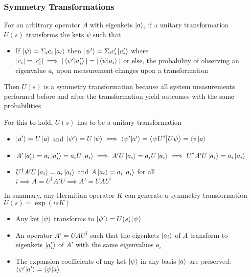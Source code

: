 \documentclass[8pt,t,mathserif,aspectratio=169]{beamer}
\begin{document}
\begin{frame}
  \frametitle{Symmetry Transformations}
  \vspace{1mm}
  For an arbitrary operator $A$ with eigenkets $\ket{a}$, if a unitary transformation $U(s)$ transforms the kets $\psi$ such that
  \begin{itemize}
    \item If $\ket{\psi} = \Sigma_i c_i \ket{a_i}$ then $\ket{\psi'} = \Sigma_i c_i' \ket{a_i'}$ where $|c_i| = |c_i'| \implies |\braket{\psi'}{a_i'}| = |\braket{\psi}{a_i}|$ or else, the probability of observing an eigenvalue $a_i$ upon measurement changes upon a transformation
  \end{itemize}
  Then $U(s)$ is a symmetry transformation because all system measurements performed before and after the transformation yield outcomes with the same probabilities

  For this to hold, $U(s)$ has to be a unitary transformation
  \begin{itemize}
    \item $\ket{a'} = U \ket{a}$ and $\ket{\psi'} = U \ket{\psi} \implies \braket{\psi'}{a'} = \bra{\psi U^{\dagger}}\ket{U \psi} = \braket{\psi}{a}$
    \item $A' \ket{a_i'} = a_i \ket{a_i'} = a_i U \ket{a_i} \implies A' U \ket{a_i} = a_i U \ket{a_i} \implies U^{\dagger} A' U \ket{a_i} = a_i \ket{a_i}$
    \item $U^{\dagger} A' U \ket{a_i} = a_i \ket{a_i}$ and $A \ket{a_i} = a_i \ket{a_i}$ for all $i \implies A = U^{\dagger} A' U \implies A' = U A U^{\dagger}$ 
  \end{itemize}

  In summary, any Hermitian operator $K$ can generate a symmetry transformation $U(s) = \exp(i s K)$
  \begin{itemize}
    \item Any ket $\ket{\psi}$ transforms to $\ket{\psi'} = U(s) \ket{\psi}$
    \item An operator $A' = U A U^{\dagger}$ such that the eigenkets $\ket{a_i}$ of $A$ transform to eigenkets $\ket{a'_i}$ of $A'$ with the same eigenvalues $a_i$
    \item The expansion coefficients of any ket $\ket{\psi}$ in any basis $\ket{a}$ are preserved: $\braket{\psi'}{a'} = \braket{\psi}{a}$
  \end{itemize}
\end{frame}
\end{document}
